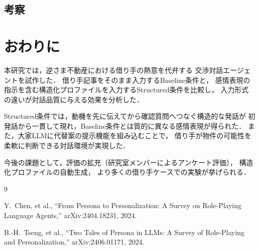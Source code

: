 \documentclass{FITpaper}
\begin{document}
\subsection{考察}


\section{おわりに}

本研究では，逆さま不動産における借り手の熱意を代弁する
交渉対話エージェントを試作した．
借り手記事をそのまま入力するBaseline条件と，
感情表現の指示を含む構造化プロファイルを入力するStructured条件を比較し，
入力形式の違いが対話品質に与える効果を分析した．

Structured条件では，動機を先に伝えてから確認質問へつなぐ構造的な発話が
初発話から一貫して現れ，Baseline条件とは質的に異なる感情表現が得られた．
また，大家LLMに代替案の提示機能を組み込むことで，
借り手が物件の可能性を柔軟に判断できる対話環境が実現した．

今後の課題として，評価の拡充（研究室メンバーによるアンケート評価），
構造化プロファイルの自動生成，
より多くの借り手ケースでの実験が挙げられる．

\acknowledgment{%
}

\begin{thebibliography}{9}

  Y.~Chen, et al.,
  ``From Persona to Personalization: A Survey on Role-Playing Language Agents,''
  arXiv:2404.18231, 2024.

  B.-H.~Tseng, et al.,
  ``Two Tales of Persona in LLMs: A Survey of Role-Playing and Personalization,''
  arXiv:2406.01171, 2024.

\end{thebibliography}
\end{document}
